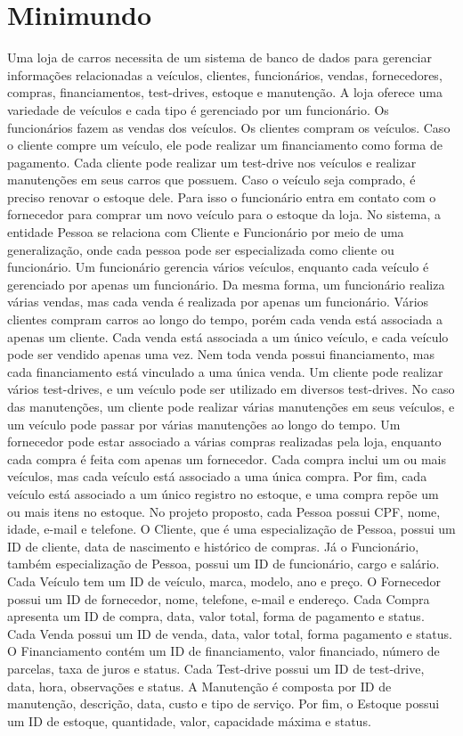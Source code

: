 \documentclass{article}
\begin{document}
\section{Minimundo} 
Uma loja de carros necessita de um sistema de banco de dados para gerenciar informações relacionadas a veículos, clientes, funcionários, vendas, fornecedores, compras, financiamentos, test-drives, estoque e manutenção. A loja oferece uma variedade de veículos e cada tipo é gerenciado por um funcionário. Os funcionários fazem as vendas dos veículos. Os clientes compram os veículos. Caso o cliente compre um veículo, ele pode realizar um financiamento como forma de pagamento. Cada cliente pode realizar um test-drive nos veículos e realizar manutenções em seus carros que possuem. Caso o veículo seja comprado, é preciso renovar o estoque dele. Para isso o funcionário entra em contato com o fornecedor para comprar um novo veículo para o estoque da loja. No sistema, a entidade Pessoa se relaciona com Cliente e Funcionário por meio de uma generalização, onde cada pessoa pode ser especializada como cliente ou funcionário. Um funcionário gerencia vários veículos, enquanto cada veículo é gerenciado por apenas um funcionário. Da mesma forma, um funcionário realiza várias vendas, mas cada venda é realizada por apenas um funcionário. Vários clientes compram carros ao longo do tempo, porém cada venda está associada a apenas um cliente. Cada venda está associada a um único veículo, e cada veículo pode ser vendido apenas uma vez. Nem toda venda possui financiamento, mas cada financiamento está vinculado a uma única venda. Um cliente pode realizar vários test-drives, e um veículo pode ser utilizado em diversos test-drives. No caso das manutenções, um cliente pode realizar várias manutenções em seus veículos, e um veículo pode passar por várias manutenções ao longo do tempo. Um fornecedor pode estar associado a várias compras realizadas pela loja, enquanto cada compra é feita com apenas um fornecedor. Cada compra inclui um ou mais veículos, mas cada veículo está associado a uma única compra. Por fim, cada veículo está associado a um único registro no estoque, e uma compra repõe um ou mais itens no estoque. No projeto proposto, cada Pessoa possui CPF, nome, idade, e-mail e telefone. O Cliente, que é uma especialização de Pessoa, possui um ID de cliente, data de nascimento e histórico de compras. Já o Funcionário, também especialização de Pessoa, possui um ID de funcionário, cargo e salário. Cada Veículo tem um ID de veículo, marca, modelo, ano e preço. O Fornecedor possui um ID de fornecedor, nome, telefone, e-mail e endereço. Cada Compra apresenta um ID de compra, data, valor total, forma de pagamento e status. Cada Venda possui um ID de venda, data, valor total, forma pagamento e status. O Financiamento contém um ID de financiamento, valor financiado, número de parcelas, taxa de juros e status. Cada Test-drive possui um ID de test-drive, data, hora, observações e status. A Manutenção é composta por ID de manutenção, descrição, data, custo e tipo de serviço. Por fim, o Estoque possui um ID de estoque, quantidade, valor, capacidade máxima e status.



\newpage
\end{document}
